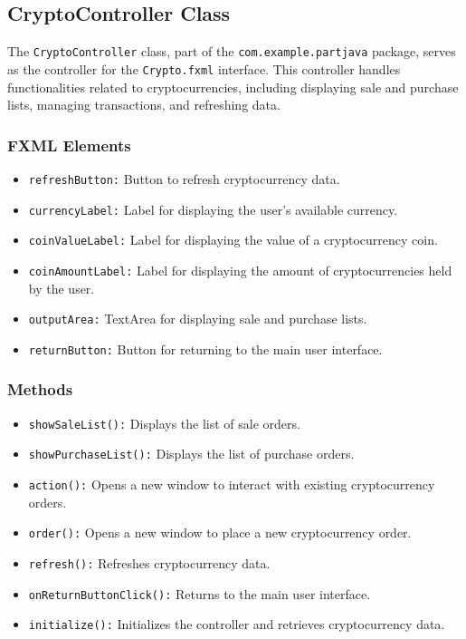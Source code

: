 \documentclass{article}
\begin{document}
\subsection{CryptoController Class}

The \texttt{CryptoController} class, part of the \texttt{com.example.partjava} package, serves as the controller for the \texttt{Crypto.fxml} interface. This controller handles functionalities related to cryptocurrencies, including displaying sale and purchase lists, managing transactions, and refreshing data.

\subsubsection{FXML Elements}

\begin{itemize}
    \item \texttt{refreshButton:} Button to refresh cryptocurrency data.
    \item \texttt{currencyLabel:} Label for displaying the user's available currency.
    \item \texttt{coinValueLabel:} Label for displaying the value of a cryptocurrency coin.
    \item \texttt{coinAmountLabel:} Label for displaying the amount of cryptocurrencies held by the user.
    \item \texttt{outputArea:} TextArea for displaying sale and purchase lists.
    \item \texttt{returnButton:} Button for returning to the main user interface.
\end{itemize}

\subsubsection{Methods}

\begin{itemize}
    \item \texttt{showSaleList():} Displays the list of sale orders.
    \item \texttt{showPurchaseList():} Displays the list of purchase orders.
    \item \texttt{action():} Opens a new window to interact with existing cryptocurrency orders.
    \item \texttt{order():} Opens a new window to place a new cryptocurrency order.
    \item \texttt{refresh():} Refreshes cryptocurrency data.
    \item \texttt{onReturnButtonClick():} Returns to the main user interface.
    \item \texttt{initialize():} Initializes the controller and retrieves cryptocurrency data.
\end{itemize}
\end{document}
